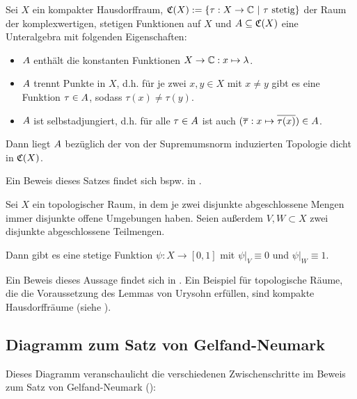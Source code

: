 \begin{satz}\label{satz:SW}
Sei $X$ ein kompakter Hausdorffraum, $\mathfrak{C}(X) :=\{\tau: X \to \mathbb{C} ~|~ \tau \text{ stetig}\}$ der Raum der komplexwertigen, stetigen Funktionen auf $X$ und $A \subseteq \mathfrak{C}(X)$ eine Unteralgebra mit folgenden Eigenschaften:
\begin{itemize}
	\item $A$ enthält die konstanten Funktionen $X \to \mathbb{C}: x \mapsto \lambda$.
	\item $A$ trennt Punkte in $X$, d.h. für je zwei $x, y \in X$ mit $x \neq y$ gibt es eine Funktion $\tau \in A$, sodass $\tau(x) \neq \tau(y)$.
	\item $A$ ist selbstadjungiert, d.h. für alle $\tau \in A$ ist auch $(\overline{\tau}: x \mapsto \overline{\tau(x)}) \in A$.
\end{itemize}
Dann liegt $A$ bezüglich der von der Supremumsnorm induzierten Topologie dicht in $\mathfrak{C}(X)$.
\end{satz}

Ein Beweis dieses Satzes findet sich bspw. in \cite[Satz VIII.4.7]{Werner2011}.


\begin{satz}\label{satz:Ury}
Sei $X$ ein topologischer Raum, in dem je zwei disjunkte abgeschlossene Mengen immer disjunkte offene Umgebungen haben. Seien außerdem $V, W \subset X$ zwei disjunkte abgeschlossene Teilmengen. 

Dann gibt es eine stetige Funktion $\psi: X \to [0,1]$ mit $\psi|_V \equiv 0$ und $\psi|_W \equiv 1$.
\end{satz}

Ein Beweis dieses Aussage findet sich in \cite[S. 136-139]{Jaenich2008}. Ein Beispiel für topologische Räume, die die Voraussetzung des Lemmas von Urysohn erfüllen, sind kompakte Hausdorffräume (siehe \cite[S. 135 (Bemerkung)]{Jaenich2008}).





\newpage
\subsection{Diagramm zum Satz von Gelfand-Neumark}\label{sec:DiagramGN}
Dieses Diagramm veranschaulicht die verschiedenen Zwischenschritte im Beweis zum Satz von Gelfand-Neumark ():

\begin{sideways}
	\begin{minipage}{18cm}
		\fontsize{8pt}{1.5}\selectfont
		
	\end{minipage}
\end{sideways}